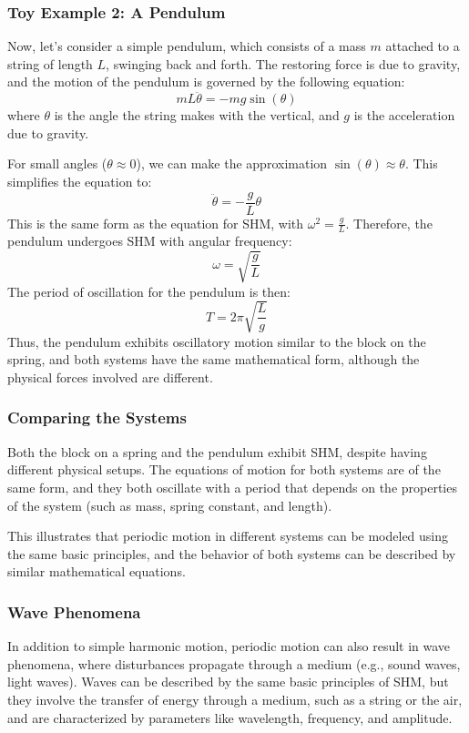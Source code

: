 \documentclass{article}
\begin{document}
\subsubsection*{Toy Example 2: A Pendulum}

Now, let’s consider a simple pendulum, which consists of a mass \( m \) attached to a string of length \( L \), swinging back and forth. The restoring force is due to gravity, and the motion of the pendulum is governed by the following equation:
\[
mL \ddot{\theta} = -mg \sin(\theta)
\]
where \( \theta \) is the angle the string makes with the vertical, and \( g \) is the acceleration due to gravity.

For small angles (\(\theta \approx 0\)), we can make the approximation \( \sin(\theta) \approx \theta \). This simplifies the equation to:
\[
\ddot{\theta} = -\frac{g}{L} \theta
\]
This is the same form as the equation for SHM, with \( \omega^2 = \frac{g}{L} \). Therefore, the pendulum undergoes SHM with angular frequency:
\[
\omega = \sqrt{\frac{g}{L}}
\]
The period of oscillation for the pendulum is then:
\[
T = 2\pi \sqrt{\frac{L}{g}}
\]
Thus, the pendulum exhibits oscillatory motion similar to the block on the spring, and both systems have the same mathematical form, although the physical forces involved are different.

\subsubsection*{Comparing the Systems}

Both the block on a spring and the pendulum exhibit SHM, despite having different physical setups. The equations of motion for both systems are of the same form, and they both oscillate with a period that depends on the properties of the system (such as mass, spring constant, and length).

This illustrates that periodic motion in different systems can be modeled using the same basic principles, and the behavior of both systems can be described by similar mathematical equations.

\subsubsection*{Wave Phenomena}

In addition to simple harmonic motion, periodic motion can also result in wave phenomena, where disturbances propagate through a medium (e.g., sound waves, light waves). Waves can be described by the same basic principles of SHM, but they involve the transfer of energy through a medium, such as a string or the air, and are characterized by parameters like wavelength, frequency, and amplitude.
\end{document}
